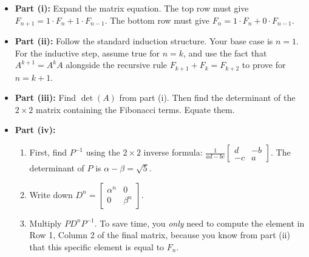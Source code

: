 \begin{hint}
\begin{itemize}
    \item \textbf{Part (i):} Expand the matrix equation. The top row must give $F_{n+1} = 1 \cdot F_n + 1 \cdot F_{n-1}$. The bottom row must give $F_n = 1 \cdot F_n + 0 \cdot F_{n-1}$. 
    \item \textbf{Part (ii):} Follow the standard induction structure. Your base case is $n=1$. For the inductive step, assume true for $n=k$, and use the fact that $A^{k+1} = A^k A$ alongside the recursive rule $F_{k+1} + F_k = F_{k+2}$ to prove for $n=k+1$.
    \item \textbf{Part (iii):} Find $\det(A)$ from part (i). Then find the determinant of the $2 \times 2$ matrix containing the Fibonacci terms. Equate them.
    \item \textbf{Part (iv):} 
    \begin{enumerate}
        \item First, find $P^{-1}$ using the $2 \times 2$ inverse formula: $\frac{1}{ad-bc}\begin{bmatrix} d & -b \\ -c & a \end{bmatrix}$. The determinant of $P$ is $\alpha - \beta = \sqrt{5}$.
        \item Write down $D^n = \begin{bmatrix} \alpha^n & 0 \\ 0 & \beta^n \end{bmatrix}$.
        \item Multiply $P D^n P^{-1}$. To save time, you \textit{only} need to compute the element in Row 1, Column 2 of the final matrix, because you know from part (ii) that this specific element is equal to $F_n$.
    \end{enumerate}
\end{itemize}
\end{hint}

